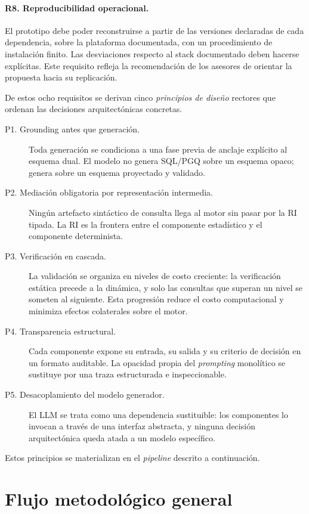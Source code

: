 \paragraph{R8. Reproducibilidad operacional.} El prototipo debe poder reconstruirse a partir de las versiones declaradas de cada dependencia, sobre la plataforma documentada, con un procedimiento de instalación finito. Las desviaciones respecto al stack documentado deben hacerse explícitas. Este requisito refleja la recomendación de los asesores de orientar la propuesta hacia su replicación.

\medskip

De estos ocho requisitos se derivan cinco \emph{principios de diseño} rectores que ordenan las decisiones arquitectónicas concretas.

\begin{description}
    \item[P1. Grounding antes que generación.] Toda generación se condiciona a una fase previa de anclaje explícito al esquema dual. El modelo no genera \ac{SQL}/\ac{PGQ} sobre un esquema opaco; genera sobre un esquema proyectado y validado.
    \item[P2. Mediación obligatoria por representación intermedia.] Ningún artefacto sintáctico de consulta llega al motor sin pasar por la \ac{RI} tipada. La \ac{RI} es la frontera entre el componente estadístico y el componente determinista.
    \item[P3. Verificación en cascada.] La validación se organiza en niveles de costo creciente: la verificación estática precede a la dinámica, y solo las consultas que superan un nivel se someten al siguiente. Esta progresión reduce el costo computacional y minimiza efectos colaterales sobre el motor.
    \item[P4. Transparencia estructural.] Cada componente expone su entrada, su salida y su criterio de decisión en un formato auditable. La opacidad propia del \emph{prompting} monolítico se sustituye por una traza estructurada e inspeccionable.
    \item[P5. Desacoplamiento del modelo generador.] El \ac{LLM} se trata como una dependencia sustituible: los componentes lo invocan a través de una interfaz abstracta, y ninguna decisión arquitectónica queda atada a un modelo específico.
\end{description}

Estos principios se materializan en el \emph{pipeline} descrito a continuación.

\section{Flujo metodológico general}
\label{sec:prop-pipeline}

